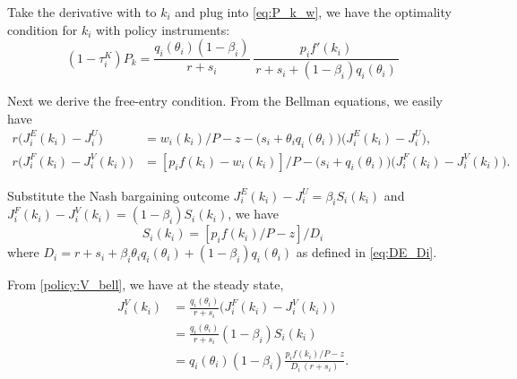 \documentclass[12pt]{article} %
\theoremstyle{definition}
\begin{document}
Take the derivative with to $k_i$ and plug into \eqref{eq:P_k_w},
we have the optimality condition for $k_i$ with policy instruments:
\begin{equation}\label{DE_policy_k}
   (1-\tau^K_i)  P_k  = \frac{q_i(\theta_i)(1-\beta_i)}{r+s_i}\,\frac{p_i f'(k_i)}{\,r+s_i+(1-\beta_i)q_i(\theta_i)\,}
\end{equation}



Next we derive the free-entry condition. From the Bellman equations, we easily have
\begin{align}
    r\big(J_i^E(k_i) - J_i^U\big) & = w_i(k_i)/P-z - \big(s_i+\theta_i q_i(\theta_i)\big) \big(J_i^E(k_i)-J_i^U\big),   \label{policy:App_JE_JU} \\
    r\big(J_i^F(k_i) - J_i^V(k_i) \big) & = [p_i f(k_i) - w_i(k_i)]/P - \big(s_i+q_i(\theta_i)\big) \big(J_i^F(k_i)-J_i^V(k_i)\big).
\end{align}

Substitute the Nash bargaining outcome $J_i^E(k_i)-J_i^U = \beta_i S_i(k_i)$ and $J_i^F(k_i)-J_i^V(k_i)=(1-\beta_i)S_i(k_i)$, %
we have
\begin{equation}
    S_i(k_i) = [p_i f(k_i)/P-z] /D_i
\end{equation}
where $D_i = r+s_i+ \beta_i \theta_i q_i(\theta_i) +(1-\beta_i) q_i(\theta_i)$ as defined in \eqref{eq:DE_Di}. 


From \eqref{policy:V_bell}, we have at the steady state,
\begin{align}
    J_i^V(k_i) &= \frac{q_i(\theta_i)}{r+s_i}\big(J_i^F(k_i)- J_i^V(k_i)\big)  \nonumber \\
    & = \frac{q_i(\theta_i)}{r+s_i}(1-\beta_i) S_i(k_i)  \nonumber \\
    & = q_i(\theta_i)(1-\beta_i) \frac{p_i f(k_i)/P-z}{D_i \,(r+s_i)}.
\end{align}
\end{document}
